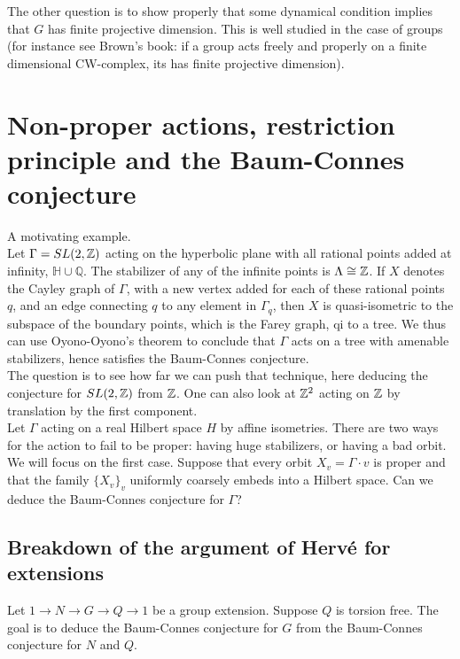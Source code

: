 The other question is to show properly that some dynamical condition implies that $G$ has finite projective dimension. This is well studied in the case of groups (for instance see Brown's book: if a group acts freely and properly on a finite dimensional CW-complex, its has finite projective dimension).
\newpage
\section{Non-proper actions, restriction principle and the Baum-Connes conjecture}  %

A motivating example.\\

Let $\Gamma = SL(2, \mathbb Z)$ acting on the hyperbolic plane with all rational points added at infinity, $\mathbb H \cup \mathbb Q$. The stabilizer of any of the infinite points is $\Lambda \cong \mathbb Z$. If $X$ denotes the Cayley graph of $\Gamma$, with a new vertex added for each of these rational points $q$, and an edge connecting $q$ to any element in $\Gamma_q$, then $X$ is quasi-isometric to the subspace of the boundary points, which is the Farey graph, qi to a tree. We thus can use Oyono-Oyono's theorem to conclude that $\Gamma$ acts on a tree with amenable stabilizers, hence satisfies the Baum-Connes conjecture.\\

The question is to see how far we can push that technique, here deducing the conjecture for $SL(2,\mathbb Z)$ from $\mathbb Z$. One can also look at $\mathbb Z^2$ acting on $\mathbb Z$ by translation by the first component.\\

Let $\Gamma$ acting on a real Hilbert space $H$ by affine isometries. There are two ways for the action to fail to be proper: having huge stabilizers, or having a bad orbit. We will focus on the first case. Suppose that every orbit $X_v= \Gamma \cdot v$ is proper and that the family $\{X_v\}_v$ uniformly coarsely embeds into a Hilbert space. Can we deduce the Baum-Connes conjecture for $\Gamma$? 

\subsection{Breakdown of the argument of Herv\'e for extensions}

Let $1 \rightarrow N \rightarrow G \rightarrow Q \rightarrow 1$ be a group extension. Suppose $Q$ is torsion free. The goal is to deduce the Baum-Connes conjecture for $G$ from the Baum-Connes conjecture for $N$ and $Q$.\\

